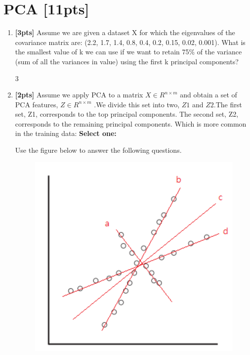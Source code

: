 \section{PCA [11pts]}

\begin{enumerate}
    \item \textbf{[3pts]} Assume we are given a dataset X for which the eigenvalues of the covariance matrix are:
    (2.2, 1.7, 1.4, 0.8, 0.4, 0.2, 0.15, 0.02, 0.001). What is the smallest value of k we can use if we want to retain 75\% of the variance (sum of all the variances in value) using the first k principal components?
    
    \begin{tcolorbox}[fit,height=1cm, width=2cm, blank, borderline={1pt}{-2pt},nobeforeafter]
    \begin{center}\huge3\end{center}
    \end{tcolorbox}
    
    
    \item \textbf{[2pts]} Assume we apply PCA to a matrix $X \in R^{n \times m}$ and obtain a set of PCA features, $Z \in R^{n \times m}$ .We divide this set into two, $Z1$ and $Z2$.The first set, Z1, corresponds to the top principal components. The second set, Z2, corresponds to the remaining principal components. Which is more common in the training data:
    \textbf{Select one:}
    
\clearpage    
Use the figure below to answer the following questions.    
    \begin{figure}[H]
    \centering
    \includegraphics[width=0.5\linewidth]{figures/pca1.png}
    \end{figure}
    

\end{enumerate}
